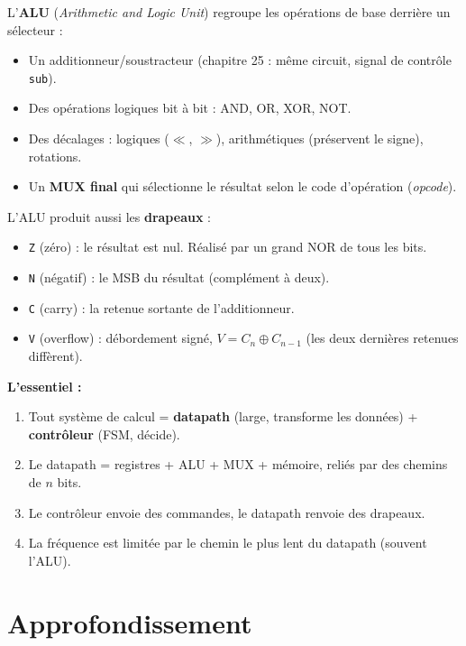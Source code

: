 \documentclass[12pt,a4paper,twoside]{book}
\begin{document}
\begin{formule}
L'\textbf{ALU} (\textit{Arithmetic and Logic Unit}) regroupe les opérations de base derrière un sélecteur :

\begin{itemize}[nosep]
\item Un additionneur/soustracteur (chapitre 25 : même circuit, signal de contrôle \texttt{sub}).
\item Des opérations logiques bit à bit : AND, OR, XOR, NOT.
\item Des décalages : logiques ($\ll$, $\gg$), arithmétiques (préservent le signe), rotations.
\item Un \textbf{MUX final} qui sélectionne le résultat selon le code d'opération (\textit{opcode}).
\end{itemize}

L'ALU produit aussi les \textbf{drapeaux} :
\begin{itemize}[nosep]
\item \texttt{Z} (zéro) : le résultat est nul. Réalisé par un grand NOR de tous les bits.
\item \texttt{N} (négatif) : le MSB du résultat (complément à deux).
\item \texttt{C} (carry) : la retenue sortante de l'additionneur.
\item \texttt{V} (overflow) : débordement signé, $V = C_{n} \oplus C_{n-1}$ (les deux dernières retenues diffèrent).
\end{itemize}
\end{formule}

\begin{retenir}
\textbf{L'essentiel :}
\begin{enumerate}[nosep]
\item Tout système de calcul = \textbf{datapath} (large, transforme les données) + \textbf{contrôleur} (FSM, décide).
\item Le datapath = registres + ALU + MUX + mémoire, reliés par des chemins de $n$ bits.
\item Le contrôleur envoie des commandes, le datapath renvoie des drapeaux.
\item La fréquence est limitée par le chemin le plus lent du datapath (souvent l'ALU).
\end{enumerate}
\end{retenir}

\section{Approfondissement}
\end{document}
